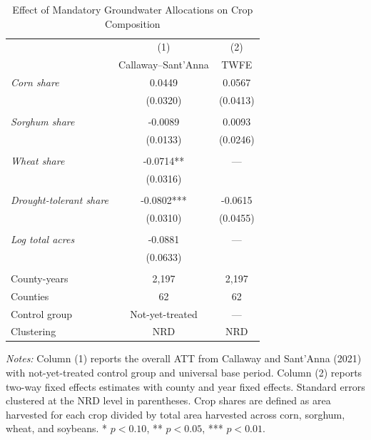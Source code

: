 \begin{table}[H]
\centering
\caption{Effect of Mandatory Groundwater Allocations on Crop Composition}
\label{tab:main}
\begin{threeparttable}
\begin{tabular}{lcc}
\toprule
 & (1) & (2) \\
 & Callaway--Sant'Anna & TWFE \\
\midrule
\textit{Corn share} & 0.0449 & 0.0567 \\
 & (0.0320) & (0.0413) \\
\\[-0.5em]
\textit{Sorghum share} & -0.0089 & 0.0093 \\
 & (0.0133) & (0.0246) \\
\\[-0.5em]
\textit{Wheat share} & -0.0714** & --- \\
 & (0.0316) &  \\
\\[-0.5em]
\textit{Drought-tolerant share} & -0.0802*** & -0.0615 \\
 & (0.0310) & (0.0455) \\
\\[-0.5em]
\textit{Log total acres} & -0.0881 & --- \\
 & (0.0633) &  \\
\\[-0.5em]
\midrule
County-years & 2,197 & 2,197 \\
Counties & 62 & 62 \\
Control group & Not-yet-treated & --- \\
Clustering & NRD & NRD \\
\bottomrule
\end{tabular}
\begin{tablenotes}[flushleft]
\small
\item \textit{Notes:} Column (1) reports the overall ATT from Callaway and Sant'Anna (2021) with not-yet-treated control group and universal base period. Column (2) reports two-way fixed effects estimates with county and year fixed effects. Standard errors clustered at the NRD level in parentheses. Crop shares are defined as area harvested for each crop divided by total area harvested across corn, sorghum, wheat, and soybeans. * $p<0.10$, ** $p<0.05$, *** $p<0.01$.
\end{tablenotes}
\end{threeparttable}
\end{table}
